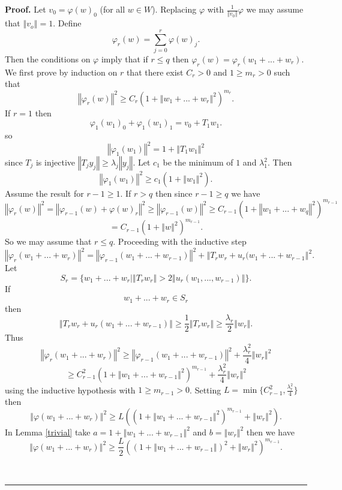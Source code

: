 \documentclass[12pt]{article}%
\newenvironment{proof}[1][Proof]{\noindent\textbf{#1.} }{\ \rule{0.5em}{0.5em}}
\begin{document}
\begin{proof}
Let $v_{0}=\varphi(w)_{0}$ (for all $w\in W$). Replacing $\varphi$ with
$\frac{1}{\left\Vert v_{0}\right\Vert }\varphi$ we may assume that $\left\Vert
v_{o}\right\Vert =1$. Define%
\[
\varphi_{r}(w)=\sum_{j=0}^{r}\varphi(w)_{j}.
\]
Then the conditions on $\varphi$ imply that if $r\leq q$ then $\varphi
_{r}(w)=\varphi_{r}(w_{1}+...+w_{r})$. We first prove by induction on $r$ that
there exist $C_{r}>0$ and $1\geq m_{r}>0$ such that
\[
\left\Vert \varphi_{r}(w)\right\Vert ^{2}\geq C_{r}(1+\left\Vert
w_{1}+...+w_{r}\right\Vert ^{2})^{m_{r}}.
\]
If $r=1$ then
\[
\varphi_{1}(w_{1})_{0}+\varphi_{1}(w_{1})_{1}=v_{0}+T_{1}w_{1}.
\]
so%
\[
\left\Vert \varphi_{1}(w_{1})\right\Vert ^{2}=1+\left\Vert T_{1}%
w_{1}\right\Vert ^{2}
\]
since $T_{j}$ is injective \thinspace$\left\Vert T_{j}y_{j}\right\Vert
\geq\lambda_{j}\left\Vert y_{j}\right\Vert $. Let $c_{1}$ be the minimum of
$1$ and $\lambda_{1}^{2}$. Then
\[
\left\Vert \varphi_{1}(w_{1})\right\Vert ^{2}\geq c_{1}(1+\left\Vert
w_{1}\right\Vert ^{2}).
\]
Assume the result for $r-1\geq1$. If $r>q$ then since $r-1\geq q$ we have
\[
\left\Vert \varphi_{r}(w)\right\Vert ^{2}=\left\Vert \varphi_{r-1}%
(w)+\varphi(w)_{r}\right\Vert ^{2}\geq\left\Vert \varphi_{r-1}(w)\right\Vert
^{2}\geq C_{r-1}(1+\left\Vert w_{1}+...+w_{q}\right\Vert ^{2})^{m_{r-1}}
\]%
\[
=C_{r-1}(1+\left\Vert w\right\Vert ^{2})^{m_{r-1}}.
\]
So we may assume that $r\leq q$. Proceeding with the inductive step
\[
\left\Vert \varphi_{r}(w_{1}+...+w_{r})\right\Vert ^{2}=\left\Vert
\varphi_{r-1}(w_{1}+...+w_{r-1})\right\Vert ^{2}+\left\Vert T_{r}w_{r}%
+u_{r}(w_{1}+...+w_{r-1}\right\Vert ^{2}.
\]
Let
\[
S_{r}=\{w_{1}+...+w_{r}|\left\Vert T_{r}w_{r}\right\Vert >2\left\Vert
u_{r}(w_{1},...,w_{r-1})\right\Vert \}.
\]
If
\[
w_{1}+...+w_{r}\in S_{r}
\]
then%
\[
\left\Vert T_{r}w_{r}+u_{r}(w_{1}+...+w_{r-1})\right\Vert \geq\frac{1}%
{2}\left\Vert T_{r}w_{r}\right\Vert \geq\frac{\lambda_{r}}{2}\left\Vert
w_{r}\right\Vert .
\]
Thus%
\[
\left\Vert \varphi_{r}(w_{1}+...+w_{r})\right\Vert ^{2}\geq\left\Vert
\varphi_{r-1}(w_{1}+...+w_{r-1})\right\Vert ^{2}+\frac{\lambda_{r}^{2}}%
{4}\left\Vert w_{r}\right\Vert ^{2}
\]%
\[
\geq C_{r-1}^{2}(1+\left\Vert w_{1}+...+w_{r-1}\right\Vert ^{2})^{m_{r-1}%
}+\frac{\lambda_{r}^{2}}{4}\left\Vert w_{r}\right\Vert ^{2}
\]
using the inductive hypothesis with $1\geq m_{r-1}>0$. Setting $L=\min
\{C_{r-1}^{2},\frac{\lambda_{r}^{2}}{4}\}$ then%
\[
\left\Vert \varphi(w_{1}+...+w_{r})\right\Vert ^{2}\geq L((1+\left\Vert
w_{1}+...+w_{r-1}\right\Vert ^{2})^{m_{r-1}}+\left\Vert w_{r}\right\Vert
^{2}).
\]
In Lemma \ref{trivial} take $a=1+\left\Vert w_{1}+...+w_{r-1}\right\Vert ^{2}
$ and $b=\left\Vert w_{r}\right\Vert ^{2}$ then we have%
\[
\left\Vert \varphi(w_{1}+...+w_{r})\right\Vert ^{2}\geq\frac{L}{2}%
((1+\left\Vert w_{1}+...+w_{r-1}\right\Vert )^{2}+\left\Vert w_{r}\right\Vert
^{2})^{m_{r-1}}.
\]



\end{proof}
\end{document}
